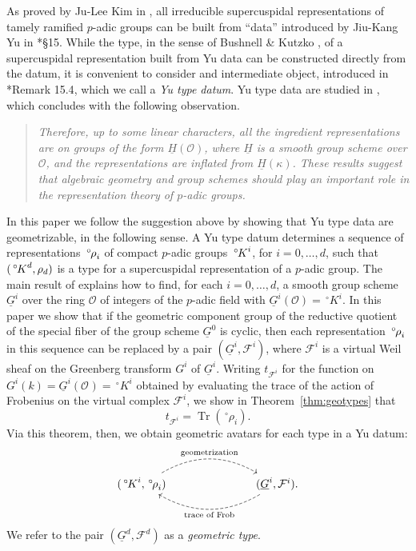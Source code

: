 \documentclass[10pt]{amsart}
\theoremstyle{plain}
\theoremstyle{definition}
\newcommand{\OO}[1]{\mathcal{O}_{#1}}
\DeclareMathOperator{\trace}{Tr}
\newcommand{\trFrob}[1]{t_{#1}}
\newcommand{\cs}[1]{{\mathcal{#1}}}
\renewcommand{\O}{{\mathcal{O}}}
\newcommand{\oK}{{\,^\circ \hskip-1pt K}}
\newcommand{\orho}{{\,^\circ \hskip-1pt \rho}}
\begin{document}
As proved by Ju-Lee Kim in \cite{kim:07a}, all irreducible supercuspidal representations of tamely ramified $p$-adic groups can be built from ``data'' introduced by Jiu-Kang Yu in \cite{yu:01a}*{\S 15}.
While the type, in the sense of Bushnell \& Kutzko \cite{bushnell-kutzko:98a}, of a supercuspidal representation built from Yu data can be constructed directly from the datum, it is convenient to consider and intermediate object, introduced in \cite{yu:01a}*{Remark 15.4}, which we call a \emph{Yu type datum}. 
Yu type data are studied in \cite{Yu:models}, which concludes with the following observation.
%
\begin{quotation}
{\it Therefore, up to some linear characters, all the ingredient representations 
 are on groups of the form $\underline{H}(\mathcal{O})$, where $\underline{H}$ is a smooth group scheme over $\mathcal{O}$, and the representations are inflated from $\underline{H}(\kappa)$. These results suggest that algebraic geometry and group schemes should play an
important role in the representation theory of $p$-adic groups.} %
\end{quotation}
%
In this paper we follow the suggestion above by showing that Yu type data are geometrizable, in the following sense.
A Yu type datum determines a sequence of representations $\orho_i$ of compact $p$-adic groups $\oK^i$, for $i=0, \ldots, d$, such that $(\oK^d, \rho_d)$ is a type for a supercuspidal representation of a $p$-adic group.
The main result of \cite{Yu:models} explains how to find, for each $i=0, \ldots, d$, a smooth group scheme $\underline{G}^i$ over the ring $\O$ of integers of the $p$-adic field with $\underline{G}^i(\O)=\,^\circ K^i $.
In this paper we show that if the geometric component group of the reductive quotient of the special fiber of the group scheme $\underline{G}^0$ is cyclic, then each representation $\orho_i$ in this sequence can be replaced by a pair $(\underline{G}^i, \cs{F}^i)$, 
where $\cs{F}^i$ is a virtual Weil sheaf on the Greenberg transform $G^i$ of $\underline{G}^i$.  
Writing $\trFrob{\cs{F}^i}$ for the function on $G^i(k) = \underline{G}^i(\OO{}) = \,^\circ K^i$ obtained by evaluating the trace of the action of Frobenius on the virtual complex $\cs{F}^i$, we show in Theorem~\ref{thm:geotypes} that 
\begin{equation}\label{eqn:intro1}
\trFrob{\cs{F}^i} = \trace(\,^\circ\rho_i).
\end{equation}
Via this theorem, then, we obtain geometric avatars for each type in a Yu datum:
\[
\begin{tikzcd}
(\oK^i,\orho_i) \arrow[bend left, dashed]{rrr}{\text{geometrization}} &&& \arrow[bend left, dashed]{lll}{\text{trace of Frob}}
(\underline{G}^i, \cs{F}^i).
\end{tikzcd}
\]
We refer to the pair $(\underline{G}^d, \cs{F}^d)$ as a \emph{geometric type}.
\end{document}

